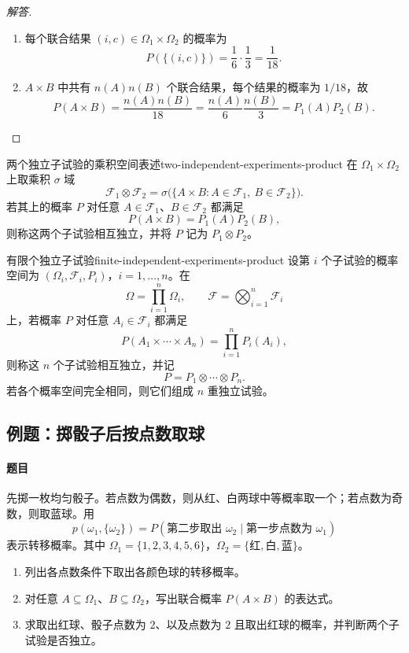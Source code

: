 \begin{proof}[解答]
\begin{enumerate}
\item 每个联合结果 $(i,c)\in\Omega_1\times\Omega_2$ 的概率为
\[
P(\{(i,c)\})=\frac16\cdot\frac13=\frac1{18}.
\]
\item $A\times B$ 中共有 $n(A)n(B)$ 个联合结果，每个结果的概率为 $1/18$，故
\[P(A\times B)=\frac{n(A)n(B)}{18}=\frac{n(A)}6\frac{n(B)}3=P_1(A)P_2(B).\]
\end{enumerate}
\end{proof}

\begin{mydefinition}{两个独立子试验的乘积空间表述}{two-independent-experiments-product}
在 $\Omega_1\times\Omega_2$ 上取乘积 $\sigma$ 域
\[
\mathscr F_1\otimes\mathscr F_2
=\sigma\bigl(\{A\times B:A\in\mathscr F_1,\ B\in\mathscr F_2\}\bigr).
\]
若其上的概率 $P$ 对任意 $A\in\mathscr F_1$、$B\in\mathscr F_2$ 都满足
\[
P(A\times B)=P_1(A)P_2(B),
\]
则称这两个子试验相互独立，并将 $P$ 记为 $P_1\otimes P_2$。
\end{mydefinition}

\begin{mydefinition}{有限个独立子试验}{finite-independent-experiments-product}
设第 $i$ 个子试验的概率空间为 $(\Omega_i,\mathscr F_i,P_i)$，$i=1,\ldots,n$。在
\[
\Omega=\prod_{i=1}^{n}\Omega_i,
\qquad
\mathscr F=\bigotimes_{i=1}^{n}\mathscr F_i
\]
上，若概率 $P$ 对任意 $A_i\in\mathscr F_i$ 都满足
\[
P(A_1\times\cdots\times A_n)
=\prod_{i=1}^{n}P_i(A_i),
\]
则称这 $n$ 个子试验相互独立，并记
\[
P=P_1\otimes\cdots\otimes P_n.
\]
若各个概率空间完全相同，则它们组成 $n$ 重独立试验。
\end{mydefinition}

\subsection{例题：掷骰子后按点数取球}\label{note:c1:e32}
\paragraph{题目}
先掷一枚均匀骰子。若点数为偶数，则从红、白两球中等概率取一个；若点数为奇数，则取蓝球。用
\[
p(\omega_1,\{\omega_2\})
=P(\text{第二步取出 }\omega_2\mid\text{第一步点数为 }\omega_1)
\]
表示转移概率。其中 $\Omega_1=\{1,2,3,4,5,6\}$，$\Omega_2=\{\text{红},\text{白},\text{蓝}\}$。
\begin{enumerate}
\item 列出各点数条件下取出各颜色球的转移概率。
\item 对任意 $A\subseteq\Omega_1$、$B\subseteq\Omega_2$，写出联合概率 $P(A\times B)$ 的表达式。
\item 求取出红球、骰子点数为 $2$、以及点数为 $2$ 且取出红球的概率，并判断两个子试验是否独立。
\end{enumerate}

